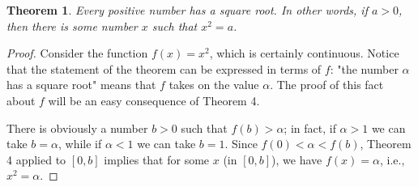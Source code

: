 \documentclass{article}
\numberwithin{definition}{subsection}
\numberwithin{lemma}{subsection}
\newtheorem{theorem}{Theorem}
\numberwithin{theorem}{subsection}
\begin{document}
\setcounter{theorem}{7}
\begin{theorem}
  Every positive number has a square root. In other words, if $a > 0$, then
  there is some number $x$ such that $x^2 = a$.
\end{theorem}
\begin{proof}
  Consider the function $f(x) = x^2$, which is certainly continuous. Notice
  that the statement of the theorem can be expressed in terms of $f$: "the
  number $\alpha$ has a square root" means that $f$ takes on the value
  $\alpha$. The proof of this fact about $f$ will be an easy consequence of
  Theorem 4.

  There is obviously a number $b > 0$ such that $f(b) > \alpha$; in fact, if
  $\alpha > 1$ we can take $b = \alpha$, while if $\alpha < 1$ we can take $b =
  1$. Since $f(0) < \alpha < f(b)$, Theorem 4 applied to $[0, b]$ implies that
  for some $x$ (in $[0, b]$), we have $f(x) = \alpha$, i.e., $x^2 = \alpha$.
\end{proof}
\end{document}
